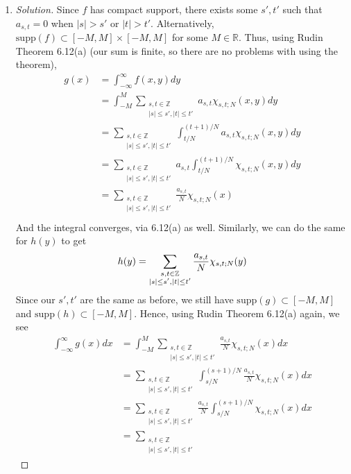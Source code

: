 \documentclass{article}
\newcommand{\Z}{{\mathbb Z}}
\newcommand{\R}{{\mathbb R}}
\theoremstyle{remark}
\begin{document}
\begin{enumerate}
	\item \begin{proof}[Solution]\let\qed\relax
		Since $f$ has compact support, there exists some $s',t'$
		such that $a_{s,t} = 0$ when $|s| > s'$ or $|t| > t'$.
		Alternatively, $\mathrm{supp}(f) \subset [-M,M] \times [-M,M]$
		for some $M \in \R$. Thus, using Rudin Theorem 6.12(a)
		(our sum is finite, so there are no problems with using the theorem),
		\begin{align*}
			g(x) &= \int_{-\infty}^\infty f(x,y)dy\\
				 &= \int_{-M}^M \sum_{\substack{s,t\in\Z\\|s|\leq s',|t|\leq t'}} a_{s,t}
			\chi_{s,t;N}(x,y)dy\\
				 &= \sum_{{\substack{s,t\in\Z\\|s|\leq s',|t|\leq t'}}}
			\int_{t/N}^{(t+1)/N} a_{s,t}\chi_{s,t;N}(x,y)dy\\
				 &= \sum_{{\substack{s,t\in\Z\\|s|\leq s',|t|\leq t'}}}
				 a_{s,t}\int_{t/N}^{(t+1)/N}\chi_{s,t;N}(x,y)dy\\
				 &= \sum_{{\substack{s,t\in\Z\\|s|\leq s',|t|\leq t'}}}
				 \frac{a_{s,t}}{N}\chi_{s,t;N}(x)\\
		\end{align*}
		And the integral converges, via 6.12(a) as well.
		Similarly, we can do the same for $h(y)$ to get
		\[
			h(y) = \sum_{{\substack{s,t\in\Z\\|s|\leq s',|t|\leq t'}}}
			\frac{a_{s,t}}{N}\chi_{s,t;N}(y)\\
		\]
		Since our $s',t'$ are the same as before,
		we still have $\mathrm{supp}(g) \subset [-M,M]$
		and $\mathrm{supp}(h) \subset [-M,M]$.
		Hence, using Rudin Theorem 6.12(a) again, we see
		\begin{align*}
			\int_{-\infty}^\infty g(x)dx
			&= \int_{-M}^M \sum_{{\substack{s,t\in\Z\\|s|\leq s',|t|\leq t'}}}
				 \frac{a_{s,t}}{N}\chi_{s,t;N}(x)dx\\
			&= \sum_{{\substack{s,t\in\Z\\|s|\leq s',|t|\leq t'}}}
			\int_{s/N}^{(s+1)/N} \frac{a_{s,t}}{N}\chi_{s,t;N}(x)dx\\
			&= \sum_{{\substack{s,t\in\Z\\|s|\leq s',|t|\leq t'}}}
			\frac{a_{s,t}}{N}\int_{s/N}^{(s+1)/N}\chi_{s,t;N}(x)dx\\
			&= \sum_{{\substack{s,t\in\Z\\|s|\leq s',|t|\leq t'}}}

\end{align*}
\end{proof}
\end{enumerate}
\end{document}
